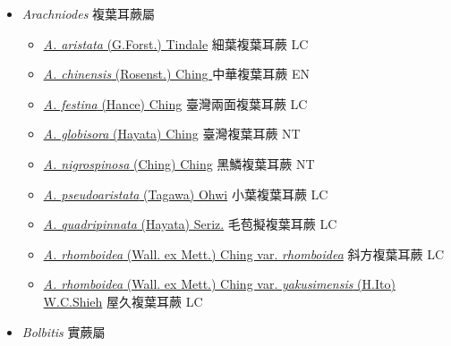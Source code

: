 
  \begin{itemize}
 \item[] \textit{Arachniodes} 複葉耳蕨屬
                    
  \begin{itemize}
        \item[] \href{http://www.theplantlist.org/tpl1.1/search?q=Arachniodes+aristata}{\textit{A. aristata} (G.Forst.) Tindale}   細葉複葉耳蕨 LC
        \item[] \href{http://www.theplantlist.org/tpl1.1/search?q=Arachniodes+chinensis}{\textit{A. chinensis} (Rosenst.) Ching }   中華複葉耳蕨 EN
        \item[] \href{http://www.theplantlist.org/tpl1.1/search?q=Arachniodes+festina}{\textit{A. festina} (Hance) Ching}   臺灣兩面複葉耳蕨 LC
        \item[] \href{http://www.theplantlist.org/tpl1.1/search?q=Arachniodes+globisora}{\textit{A. globisora} (Hayata) Ching}   臺灣複葉耳蕨 NT
        \item[] \href{http://www.theplantlist.org/tpl1.1/search?q=Arachniodes+nigrospinosa}{\textit{A. nigrospinosa} (Ching) Ching}   黑鱗複葉耳蕨 NT
        \item[] \href{http://www.theplantlist.org/tpl1.1/search?q=Arachniodes+pseudoaristata}{\textit{A. pseudoaristata} (Tagawa) Ohwi}   小葉複葉耳蕨 LC
        \item[] \href{http://www.theplantlist.org/tpl1.1/search?q=Arachniodes+quadripinnata}{\textit{A. quadripinnata} (Hayata) Seriz.}   毛苞擬複葉耳蕨 LC
        \item[] \href{http://www.theplantlist.org/tpl1.1/search?q=Arachniodes+rhomboidea+var.+rhomboidea}{\textit{A. rhomboidea} (Wall. ex Mett.) Ching var. \textit{rhomboidea}}   斜方複葉耳蕨 LC
        \item[] \href{http://www.theplantlist.org/tpl1.1/search?q=Arachniodes+rhomboidea+var.+yakusimensis}{\textit{A. rhomboidea} (Wall. ex Mett.) Ching var. \textit{yakusimensis} (H.Ito) W.C.Shieh}   屋久複葉耳蕨 LC
  \end{itemize}
 \item[] \textit{Bolbitis} 實蕨屬
                    

\end{itemize}
